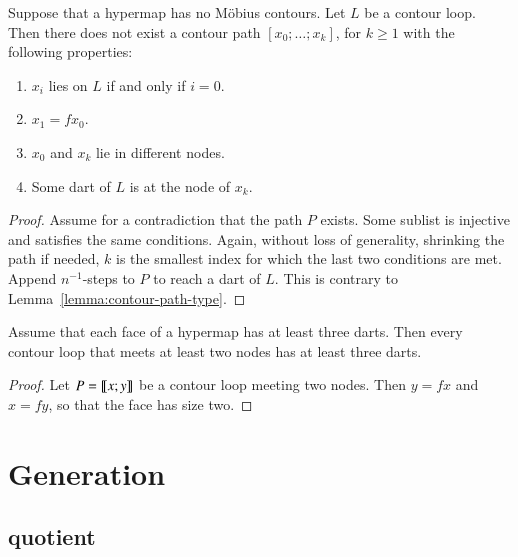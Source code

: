 \begin{lemma}
Suppose that a hypermap has no M\"obius contours.  Let $L$ be a
contour loop.  Then there does not exist a contour path
$[x_0;\ldots;x_k]$, for $k\ge 1$ with the following properties:
\begin{enumerate}
\item $x_i$ lies on $L$ if and only if $i=0$.
\item $x_1 = f x_0$.
\item $x_0$ and $x_k$ lie in different nodes.
\item Some dart of $L$ is at the node of $x_k$.
\end{enumerate}
\end{lemma}


\begin{proof} Assume for a contradiction that the path $P$ exists.
Some sublist is injective and satisfies the same conditions.  Again,
without loss of generality, shrinking the path if needed, $k$ is the
smallest index for which the last two conditions are met.  Append
$n^{-1}$-steps to $P$ to reach a dart of $L$.  This is contrary to
Lemma~\ref{lemma:contour-path-type}.
\end{proof}

\begin{lemma}\label{lemma:3dart}  
Assume that each face of a hypermap  has at least three darts.
Then every contour loop that meets at least two nodes has at least
three darts.
\end{lemma}

\begin{proof} Let $P={\llbracket{x;y}\rrbracket}$ be a contour loop meeting two nodes.  Then
$y = f x$ and $x = f y$, so that the face has size two.
\end{proof}

\section{Generation}
%

\subsection{quotient}
%


